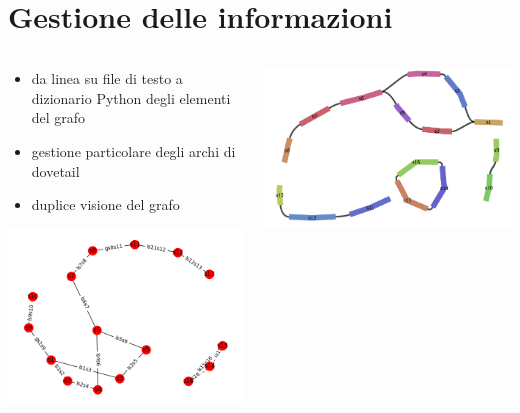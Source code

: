 \documentclass{beamer}
\begin{document}
\section{Gestione delle informazioni}
\begin{frame}{\secname}
	\begin{columns}
		\begin{column}{0.5\textwidth}
			\begin{itemize}
				\item da linea su file di testo a dizionario Python degli elementi del grafo
				\item gestione particolare degli archi di dovetail
				\item duplice visione del grafo
			\end{itemize}
			\includegraphics[scale=0.35]{matplot-es}
		\end{column}
		\begin{column}{0.5\textwidth}
			\centering
			\includegraphics[scale=0.35]{bandage-es}
		\end{column}
	\end{columns}
\end{frame}
\end{document}
